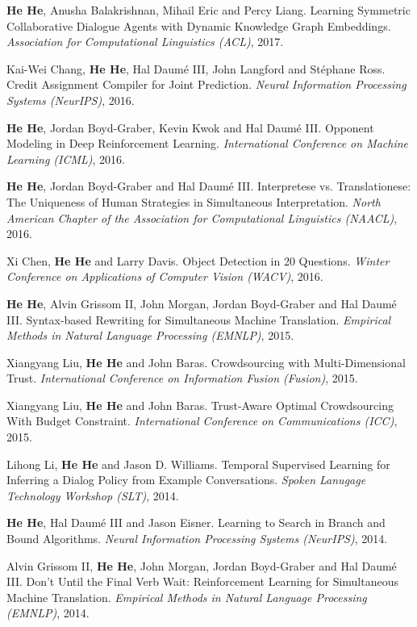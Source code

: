 \textbf{He He}, Anusha Balakrishnan, Mihail Eric and Percy Liang. Learning Symmetric Collaborative Dialogue Agents with Dynamic Knowledge Graph Embeddings. \textit{Association for Computational Linguistics (ACL)}, 2017.

Kai-Wei Chang, \textbf{He He}, Hal Daum\'e III, John Langford and St\'ephane Ross. Credit Assignment Compiler for Joint Prediction. \textit{Neural Information Processing Systems (NeurIPS)}, 2016.

\textbf{He He}, Jordan Boyd-Graber, Kevin Kwok and Hal Daum\'e III. Opponent Modeling in Deep Reinforcement Learning. \textit{International Conference on Machine Learning (ICML)}, 2016.

\textbf{He He}, Jordan Boyd-Graber and Hal Daum\'e III. Interpretese vs. Translationese: The Uniqueness of Human Strategies in Simultaneous Interpretation. \textit{North American Chapter of the Association for Computational Linguistics (NAACL)}, 2016.

Xi Chen, \textbf{He He} and Larry Davis. Object Detection in 20 Questions. \textit{Winter Conference on Applications of Computer Vision (WACV)}, 2016.

\textbf{He He}, Alvin Grissom II, John Morgan, Jordan Boyd-Graber and Hal Daum\'e III. Syntax-based Rewriting for Simultaneous Machine Translation. \textit{Empirical Methods in Natural Language Processing (EMNLP)}, 2015.

Xiangyang Liu, \textbf{He He} and John Baras. Crowdsourcing with Multi-Dimensional Trust. \textit{International Conference on Information Fusion (Fusion)}, 2015.

Xiangyang Liu, \textbf{He He} and John Baras. Trust-Aware Optimal Crowdsourcing With Budget Constraint. \textit{International Conference on Communications (ICC)}, 2015.

Lihong Li, \textbf{He He} and Jason D. Williams. Temporal Supervised Learning for Inferring a Dialog Policy from Example Conversations. \textit{Spoken Lanugage Technology Workshop (SLT)}, 2014.

\textbf{He He}, Hal Daum\'e III and Jason Eisner. Learning to Search in Branch and Bound Algorithms. \textit{Neural Information Processing Systems (NeurIPS)}, 2014.

Alvin Grissom II, \textbf{He He}, John Morgan, Jordan Boyd-Graber and Hal Daum\'e III. Don't Until the Final Verb Wait: Reinforcement Learning for Simultaneous Machine Translation. \textit{Empirical Methods in Natural Language Processing (EMNLP)}, 2014.

